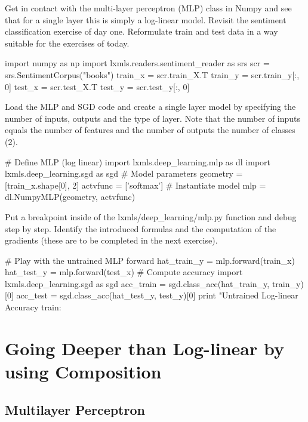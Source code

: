 \begin{exercise}
Get in contact with the multi-layer perceptron (MLP) class in Numpy and see
that for a single layer this is simply a log-linear model. Revisit the
sentiment classification exercise of day one. Reformulate train and test data
in a way suitable for the exercises of today.  
\begin{python}
import numpy as np
import lxmls.readers.sentiment_reader as srs  
scr     = srs.SentimentCorpus("books")
train_x = scr.train_X.T
train_y = scr.train_y[:, 0]
test_x  = scr.test_X.T
test_y  = scr.test_y[:, 0]
\end{python}
%
Load the MLP and SGD code and create a single layer model by specifying the
number of inputs, outputs and the type of layer. Note that the number of inputs
equals the number of features and the number of outputs the number of classes
(2).
%
\begin{python}
# Define MLP (log linear)
import lxmls.deep_learning.mlp as dl
import lxmls.deep_learning.sgd as sgd
# Model parameters
geometry = [train_x.shape[0], 2]
actvfunc = ['softmax']
# Instantiate model
mlp      = dl.NumpyMLP(geometry, actvfunc)
\end{python}
Put a breakpoint inside of the lxmls/deep\_learning/mlp.py function and debug
step by step. Identify the introduced formulas and the computation of the
gradients (these are to be completed in the next exercise). 
\begin{python}
# Play with the untrained MLP forward
hat_train_y = mlp.forward(train_x) 
hat_test_y  = mlp.forward(test_x) 
# Compute accuracy
import lxmls.deep_learning.sgd as sgd
acc_train = sgd.class_acc(hat_train_y, train_y)[0]
acc_test  = sgd.class_acc(hat_test_y, test_y)[0]
print "Untrained Log-linear Accuracy train: %
\end{python}
\end{exercise}

\section{Going Deeper than Log-linear by using Composition}
\label{sec:deep_forward}

\subsection{Multilayer Perceptron}

